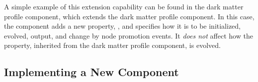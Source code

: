 A simple example of this extension capability can be found in the \href{https://github.com/galacticusorg/galacticus/releases/download/bleeding-edge/Galacticus_Physics.pdf#sec.DarkMatterProfileScaleShape} dark matter profile component, which extends the \href{https://github.com/galacticusorg/galacticus/releases/download/bleeding-edge/Galacticus_Physics.pdf#sec.DarkMatterProfileScale} dark matter profile component. In this case, the  component adds a new property, , and specifies how it is to be initialized, evolved, output, and change by node promotion events. It \emph{does not} affect how the  property, inherited from the  dark matter profile component, is evolved.

\subsection{Implementing a New Component}\label{sec:ComponentImplement}

